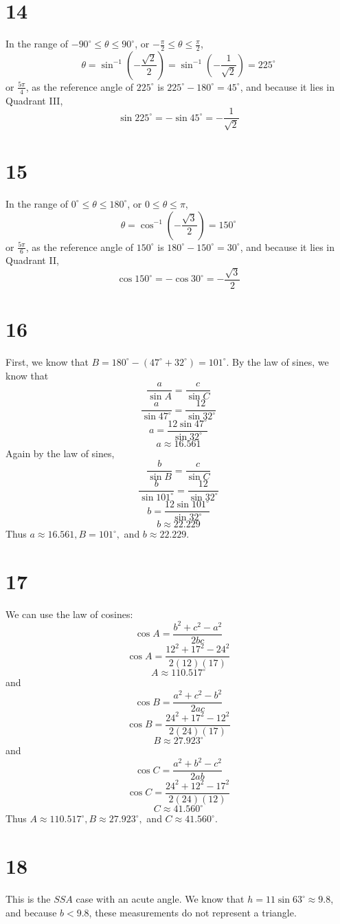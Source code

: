 \documentclass{article}
\theoremstyle{definition}
\newcommand{\?}{\stackrel{?}{=}}
\begin{document}
\section*{14}
In the range of $-90^\circ\le\theta\le 90^\circ$, or $-\frac{\pi}{2}\le\theta\le\frac{\pi}{2}$,
\[ \theta=\sin^{-1}(-\frac{\sqrt{2}}{2})=\sin^{-1}(-\frac{1}{\sqrt{2}})=225^\circ \] or $\frac{5\pi}{4}$, as the reference angle of $225^\circ$ is
$225^\circ-180^\circ=45^\circ$, and because it lies in Quadrant III,
\[ \sin 225^\circ=-\sin 45^\circ=-\frac{1}{\sqrt{2}} \]

\section*{15}
In the range of $0^\circ\le\theta\le 180^\circ$, or $0\le\theta\le\pi$,
\[ \theta=\cos^{-1}(-\frac{\sqrt{3}}{2})=150^\circ \] or $\frac{5\pi}{6}$, as the reference angle of $150^\circ$ is
$180^\circ-150^\circ=30^\circ$, and because it lies in Quadrant II,
\[ \cos 150^\circ=-\cos 30^\circ=-\frac{\sqrt{3}}{2} \]

\section*{16}
First, we know that $B=180^\circ -(47^\circ+32^\circ)=101^\circ$. By the law of sines, we know that
\[ \frac{a}{\sin A}=\frac{c}{\sin C} \]
\[ \frac{a}{\sin 47^\circ}=\frac{12}{\sin 32^\circ} \]
\[ a=\frac{12\sin 47^\circ}{\sin 32^\circ} \]
\[ a\approx 16.561 \]
Again by the law of sines,
\[ \frac{b}{\sin B}=\frac{c}{\sin C} \]
\[ \frac{b}{\sin 101^\circ}=\frac{12}{\sin 32^\circ} \]
\[ b=\frac{12\sin 101^\circ}{\sin 32^\circ} \]
\[ b\approx 22.229 \]
Thus $a\approx 16.561,B=101^\circ,$ and $b\approx 22.229$.

\section*{17}
We can use the law of cosines:
\[ \cos A=\frac{b^2+c^2-a^2}{2bc} \]
\[ \cos A=\frac{12^2+17^2-24^2}{2(12)(17)} \]
\[ A\approx 110.517^\circ \]
and
\[ \cos B=\frac{a^2+c^2-b^2}{2ac} \]
\[ \cos B=\frac{24^2+17^2-12^2}{2(24)(17)} \]
\[ B\approx 27.923^\circ \]
and
\[ \cos C=\frac{a^2+b^2-c^2}{2ab} \]
\[ \cos C=\frac{24^2+12^2-17^2}{2(24)(12)} \]
\[ C\approx 41.560^\circ \]
Thus $A\approx 110.517^\circ,B\approx 27.923^\circ,$ and $C\approx 41.560^\circ$.

\section*{18}
This is the $SSA$ case with an acute angle. We know that $h=11\sin 63^\circ\approx 9.8$, and because $b<9.8$, these measurements do not represent a triangle.
\end{document}
